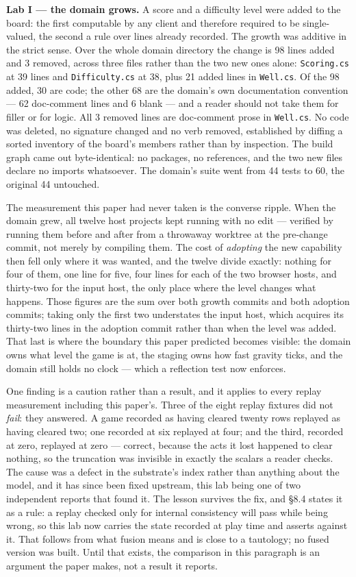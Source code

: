 \documentclass[
]{article}
\begin{document}
\textbf{Lab I --- the domain grows.} A score and a difficulty level were
added to the board: the first computable by any client and therefore
required to be single-valued, the second a rule over lines already
recorded. The growth was additive in the strict sense. Over the whole
domain directory the change is 98 lines added and 3 removed, across
three files rather than the two new ones alone: \texttt{Scoring.cs} at
39 lines and \texttt{Difficulty.cs} at 38, plus 21 added lines in
\texttt{Well.cs}. Of the 98 added, 30 are code; the other 68 are the
domain's own documentation convention --- 62 doc-comment lines and 6
blank --- and a reader should not take them for filler or for logic. All
3 removed lines are doc-comment prose in \texttt{Well.cs}. No code was
deleted, no signature changed and no verb removed, established by
diffing a sorted inventory of the board's members rather than by
inspection. The build graph came out byte-identical: no packages, no
references, and the two new files declare no imports whatsoever. The
domain's suite went from 44 tests to 60, the original 44 untouched.

The measurement this paper had never taken is the converse ripple. When
the domain grew, all twelve host projects kept running with no edit ---
verified by running them before and after from a throwaway worktree at
the pre-change commit, not merely by compiling them. The cost of
\emph{adopting} the new capability then fell only where it was wanted,
and the twelve divide exactly: nothing for four of them, one line for
five, four lines for each of the two browser hosts, and thirty-two for
the input host, the only place where the level changes what happens.
Those figures are the sum over both growth commits and both adoption
commits; taking only the first two understates the input host, which
acquires its thirty-two lines in the adoption commit rather than when
the level was added. That last is where the boundary this paper
predicted becomes visible: the domain owns what level the game is at,
the staging owns how fast gravity ticks, and the domain still holds no
clock --- which a reflection test now enforces.

One finding is a caution rather than a result, and it applies to every
replay measurement including this paper's. Three of the eight replay
fixtures did not \emph{fail}: they answered. A game recorded as having
cleared twenty rows replayed as having cleared two; one recorded at six
replayed at four; and the third, recorded at zero, replayed at zero ---
correct, because the acts it lost happened to clear nothing, so the
truncation was invisible in exactly the scalars a reader checks. The
cause was a defect in the substrate's index rather than anything about
the model, and it has since been fixed upstream, this lab being one of
two independent reports that found it. The lesson survives the fix, and
§8.4 states it as a rule: a replay checked only for internal consistency
will pass while being wrong, so this lab now carries the state recorded
at play time and asserts against it. That follows from what fusion means
and is close to a tautology; no fused version was built. Until that
exists, the comparison in this paragraph is an argument the paper makes,
not a result it reports.
\end{document}
